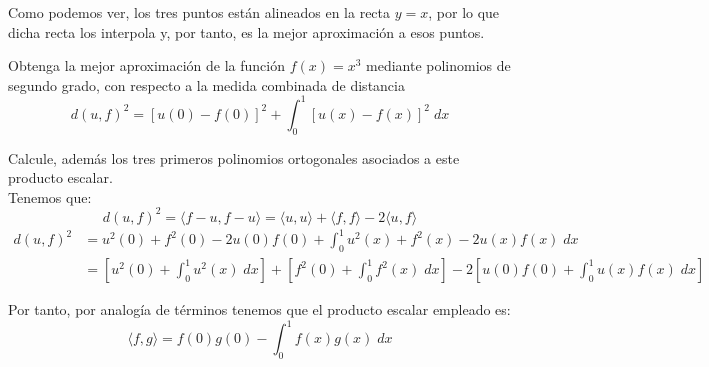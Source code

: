 \begin{ejercicio}
\begin{enumerate}
\begin{observacion}
\begin{figure}[H]
            \end{figure}

            Como podemos ver, los tres puntos están alineados en la recta $y=x$, por lo que dicha recta los interpola y, por tanto, es la mejor aproximación a esos puntos.
        \end{observacion}
    \end{enumerate}
\end{ejercicio}

\begin{ejercicio}
    Obtenga la mejor aproximación de la función $f(x) = x^3$ mediante polinomios de segundo grado, con respecto a la medida combinada de distancia
    \begin{equation*}
        d(u,f)^2 = [u(0)-f(0)]^2 + \int_0^1 [u(x) - f(x)]^2\;dx
    \end{equation*}

    Calcule, además los tres primeros polinomios ortogonales asociados a este producto escalar.\\


    Tenemos que:
    \begin{equation*}
        d(u,f)^2 = \langle f-u,f-u\rangle = \langle u,u\rangle + \langle f,f\rangle -2\langle u,f\rangle
    \end{equation*}
    \begin{equation*}
        \begin{split}
            d(u,f)^2& = u^2(0) + f^2(0) -2u(0)f(0) + \int_0^1 u^2(x) + f^2(x) -2u(x)f(x)\;dx \\
            &= \left[u^2(0) + \int_0^1 u^2(x)\;dx\right] + \left[f^2(0) + \int_0^1 f^2(x)\;dx\right] -2\left[u(0)f(0) + \int_0^1 u(x)f(x)\;dx\right]
        \end{split}
    \end{equation*}

    Por tanto, por analogía de términos tenemos que el producto escalar empleado es:
    \begin{equation*}
        \langle f,g\rangle = f(0)g(0) -\int_0^1 f(x)g(x)\;dx
    \end{equation*}
\end{ejercicio}

